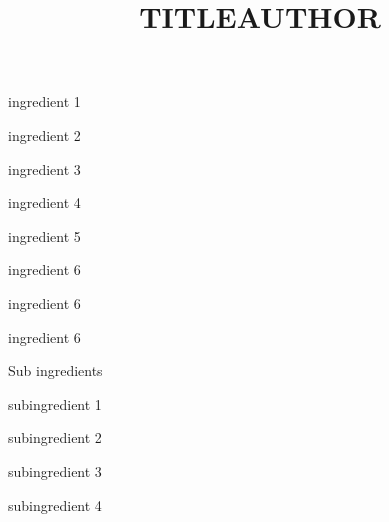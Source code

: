 \documentclass[a4paper,12pt]{article}
\begin{document}
\title{\textbf{TITLE}\footnotesize{AUTHOR}}

\begin{ingredient}
\begin{main}
\item ingredient 1
\item ingredient 2
\item ingredient 3
\item ingredient 4
\item ingredient 5
\item ingredient 6
\item ingredient 6
\item ingredient 6
\end{main}
\begin{subingredient}{Sub ingredients}
	\item subingredient 1
	\item subingredient 2
	\item subingredient 3
	\item subingredient 4
\end{subingredient}
\end{ingredient} %
\begin{recipe}

\end{recipe}

\begin{notes}

\end{notes}
\end{document}
